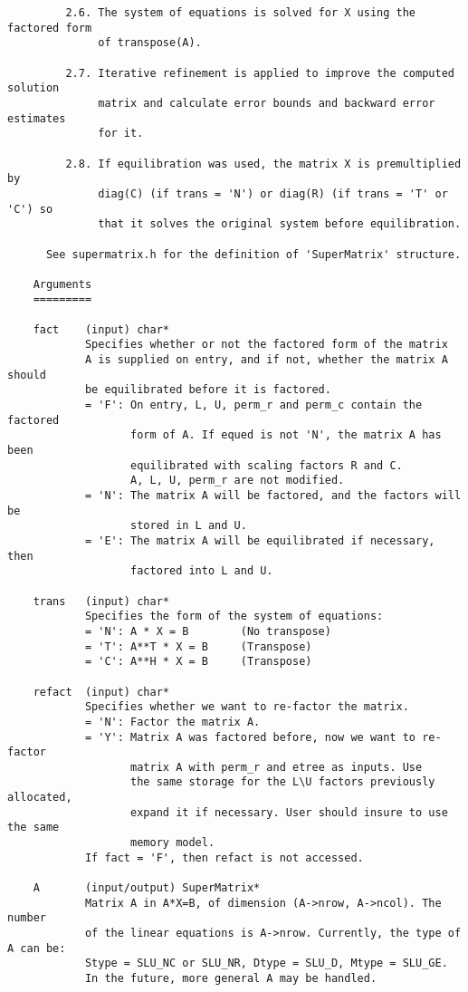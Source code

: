 \begin{verbatim}
         2.6. The system of equations is solved for X using the factored form
              of transpose(A).
   
         2.7. Iterative refinement is applied to improve the computed solution
              matrix and calculate error bounds and backward error estimates
              for it.
   
         2.8. If equilibration was used, the matrix X is premultiplied by
              diag(C) (if trans = 'N') or diag(R) (if trans = 'T' or 'C') so
              that it solves the original system before equilibration.
   
      See supermatrix.h for the definition of 'SuperMatrix' structure.
   
    Arguments
    =========
   
    fact    (input) char*
            Specifies whether or not the factored form of the matrix
            A is supplied on entry, and if not, whether the matrix A should
            be equilibrated before it is factored.
            = 'F': On entry, L, U, perm_r and perm_c contain the factored
                   form of A. If equed is not 'N', the matrix A has been
                   equilibrated with scaling factors R and C.
                   A, L, U, perm_r are not modified.
            = 'N': The matrix A will be factored, and the factors will be
                   stored in L and U.
            = 'E': The matrix A will be equilibrated if necessary, then
                   factored into L and U.
   
    trans   (input) char*
            Specifies the form of the system of equations:
            = 'N': A * X = B        (No transpose)
            = 'T': A**T * X = B     (Transpose)
            = 'C': A**H * X = B     (Transpose)
   
    refact  (input) char*
            Specifies whether we want to re-factor the matrix.
            = 'N': Factor the matrix A.
            = 'Y': Matrix A was factored before, now we want to re-factor
                   matrix A with perm_r and etree as inputs. Use
                   the same storage for the L\U factors previously allocated,
                   expand it if necessary. User should insure to use the same
                   memory model.
            If fact = 'F', then refact is not accessed.
   
    A       (input/output) SuperMatrix*
            Matrix A in A*X=B, of dimension (A->nrow, A->ncol). The number
            of the linear equations is A->nrow. Currently, the type of A can be:
            Stype = SLU_NC or SLU_NR, Dtype = SLU_D, Mtype = SLU_GE.
            In the future, more general A may be handled.
   

\end{verbatim}
